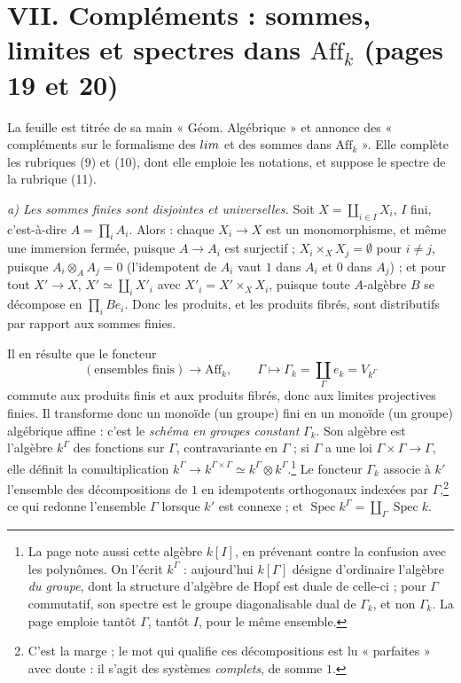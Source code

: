 \documentclass[11pt,a4paper]{article}
\begin{document}
\section*{VII. Compléments : sommes, limites et spectres dans $\mathrm{Aff}_k$ (pages 19 et 20)}

La feuille est titrée de sa main « Géom. Algébrique » et annonce des
« compléments sur le formalisme des $\varprojlim$ et des sommes dans
$\mathrm{Aff}_k$ ». Elle complète les rubriques (9) et (10), dont elle emploie les
notations, et suppose le spectre de la rubrique (11).

\emph{a) Les sommes finies sont disjointes et universelles.} Soit
$X = \coprod_{i \in I} X_i$, $I$ fini, c'est-à-dire $A = \prod_i A_i$. Alors :
chaque $X_i \to X$ est un monomorphisme, et même une immersion fermée, puisque
$A \to A_i$ est surjectif ; $X_i \times_X X_j = \emptyset$ pour $i \neq j$,
puisque $A_i \otimes_A A_j = 0$ (l'idempotent de $A_i$ vaut $1$ dans $A_i$ et
$0$ dans $A_j$) ; et pour tout $X' \to X$, $X' \simeq \coprod_i X'_i$ avec
$X'_i = X' \times_X X_i$, puisque toute $A$-algèbre $B$ se décompose en
$\prod_i B e_i$. Donc les produits, et les produits fibrés, sont distributifs
par rapport aux sommes finies.

Il en résulte que le foncteur
\[
(\text{ensembles finis}) \longrightarrow \mathrm{Aff}_k, \qquad
\Gamma \longmapsto \Gamma_k = \coprod_{\Gamma} e_k = V_{k^{\Gamma}}
\]
commute aux produits finis et aux produits fibrés, donc aux limites projectives
finies. Il transforme donc un monoïde (un groupe) fini en un monoïde (un groupe)
algébrique affine : c'est le \emph{schéma en groupes constant} $\Gamma_k$. Son
algèbre est l'algèbre $k^{\Gamma}$ des fonctions sur $\Gamma$, contravariante
en $\Gamma$ ; si $\Gamma$ a une loi $\Gamma \times \Gamma \to \Gamma$, elle
définit la comultiplication
$k^{\Gamma} \to k^{\Gamma \times \Gamma} \simeq k^{\Gamma} \otimes k^{\Gamma}$.\footnote{La
page note aussi cette algèbre $k[I]$, en prévenant contre la confusion avec les
polynômes. On l'écrit $k^{\Gamma}$ : aujourd'hui $k[\Gamma]$ désigne d'ordinaire
l'algèbre \emph{du groupe}, dont la structure d'algèbre de Hopf est duale de
celle-ci ; pour $\Gamma$ commutatif, son spectre est le groupe diagonalisable
dual de $\Gamma_k$, et non $\Gamma_k$. La page emploie tantôt $\Gamma$, tantôt
$I$, pour le même ensemble.} Le foncteur $\Gamma_k$ associe à $k'$ l'ensemble
des décompositions de $1$ en idempotents orthogonaux indexées par
$\Gamma$,\footnote{C'est la marge ; le mot qui qualifie ces décompositions est
lu « parfaites » avec doute : il s'agit des systèmes \emph{complets}, de somme
$1$.} ce qui redonne l'ensemble $\Gamma$ lorsque $k'$ est connexe ; et
$\operatorname{Spec} k^{\Gamma} = \coprod_{\Gamma} \operatorname{Spec} k$.
\end{document}
